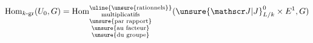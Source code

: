 \[
\operatorname{Hom}_{k\text{-gr}}(U_0,G)=
\operatorname{Hom}^{\text{\uline{\unsure{rationnels}}}}_{\substack{\text{multiplicatifs}\\\text{\unsure{par rapport}}\\\text{\unsure{au facteur}}\\\text{\unsure{du groupe}}}}
({\unsure{\mathscr J|J}}^{0}_{L/k}\times E^1,G)
\]
